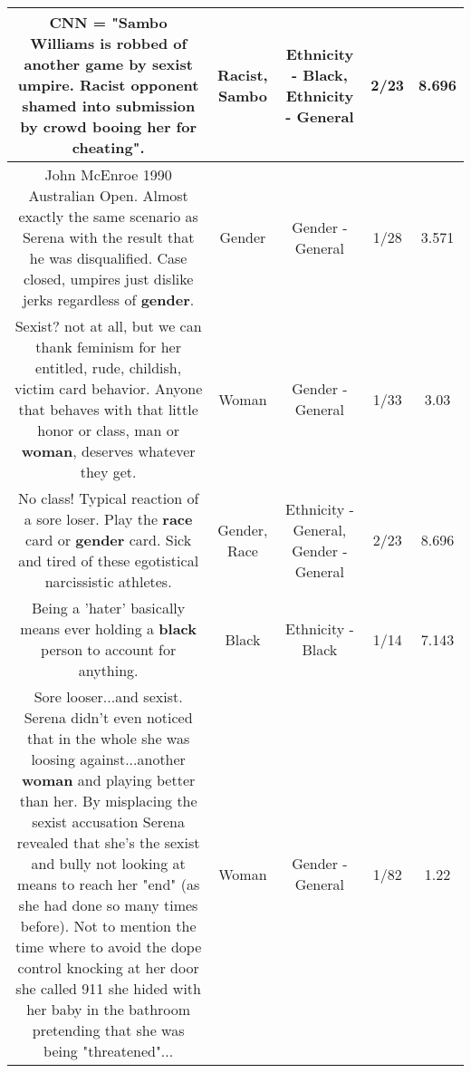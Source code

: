 \documentclass[11pt]{article}
\newlength\mylength
\begin{document}
\begin{center}
\begin{longtable}{|C{.65\mylength}|C{.30\mylength}|C{.12\mylength}|C{.12\mylength}|C{.12\mylength}|}
  \small CNN = "\textbf{Sambo} Williams is robbed of another game by sexist umpire. \textbf{Racist} opponent shamed into submission by crowd booing her for cheating".\normalsize   & Racist, Sambo & Ethnicity - Black, Ethnicity - General & 2/23 & 8.696 \\  \hline
  \small John McEnroe 1990 Australian Open.  Almost exactly the same scenario as Serena with the result that he was disqualified.   Case closed, umpires just dislike jerks regardless of \textbf{gender}.\normalsize   & Gender & Gender - General & 1/28 & 3.571 \\  \hline
  \small Sexist? not at all, but we can thank feminism for her entitled, rude, childish, victim card behavior. Anyone that behaves with that little honor or class, man or \textbf{woman}, deserves whatever they get.\normalsize   & Woman & Gender - General & 1/33 & 3.03 \\  \hline
  \small No class! Typical reaction of a sore loser. Play the \textbf{race} card or \textbf{gender} card. Sick and tired of these egotistical narcissistic athletes.\normalsize   & Gender, Race & Ethnicity - General, Gender - General & 2/23 & 8.696 \\  \hline
  \small Being a 'hater' basically means ever holding a \textbf{black} person to account for anything.\normalsize   & Black & Ethnicity - Black & 1/14 & 7.143 \\  \hline
  \small Sore looser...and sexist. Serena didn't even noticed that in the whole she was loosing against...another \textbf{woman} and playing better than her. By misplacing the sexist accusation Serena revealed that she's the sexist and bully not looking at means to reach her "end" (as she had done so many times before). Not to mention the time where to avoid the dope control knocking at her door she called 911 she hided with her baby in the bathroom pretending that she was being "threatened"...\normalsize   & Woman & Gender - General & 1/82 & 1.22 \\  \hline

\end{longtable}
\end{center}
\end{document}
